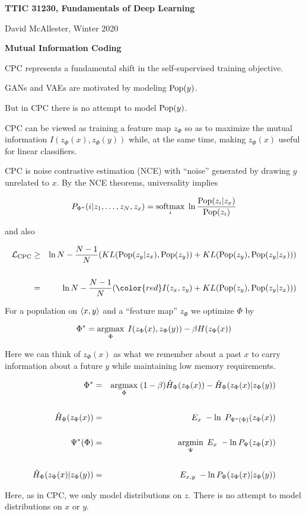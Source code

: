 





{\Huge
  \centerline{\bf TTIC 31230,  Fundamentals of Deep Learning}
  \vfill
  \centerline{David McAllester, Winter 2020}
  \vfill
  \centerline{\bf Mutual Information Coding}
  \vfill
  \vfill
  

CPC represents a fundamental shift in the self-supervised training objective.

\vfill
GANs and VAEs are motivated by modeling $\mathrm{Pop}(y)$.

\vfill
But in CPC there is no attempt to model $\mathrm{Pop}(y)$.

\vfill
CPC can be viewed as training a feature map $z_\Phi$ so as to maximize the mutual information {\color{red} $I(z_\Phi(x),z_\Phi(y))$} while, at the same time, making $z_\Phi(x)$ useful
for linear classifiers.


CPC is noise contrastive estimation (NCE) with ``noise'' generated by drawing $y$ unrelated to $x$.
By the NCE theorems, universality implies

$$P_{\Phi^*}(i|z_1,\ldots,z_N,z_x) = \operatorname*{softmax}_i \;\ln \frac{\mathrm{Pop}(z_i|z_x)}{\mathrm{Pop}(z_i)}$$

and also

{\huge
\begin{eqnarray*}
{\cal L}_\mathrm{CPC} & \geq & \ln N - \frac{N-1}{N}(KL(\pop(z_y|z_x),\pop(z_y)) + KL(\pop(z_y),\pop(z_y|z_x))) \\
\\
& = & \ln N - \frac{N-1}{N}({\color{red} I(z_x,z_y)} + KL(\pop(z_y),\pop(z_y|z_x)))
\end{eqnarray*}
}


For a population on ${\mbox{$\langle x,y\rangle$}}$ and a ``feature map'' $z_\Phi$ we optimize $\Phi$ by

\vfill
$$\Phi^* = \operatorname*{argmax}_\Phi \; I(z_\Phi(x),z_\Phi(y)) - \beta H(z_\Phi(x))$$


\vfill
Here we can think of $z_\Phi(x)$ as what we remember about a past $x$ to carry information about a future $y$ while maintaining low memory requirements.


\begin{eqnarray*}
\Phi^* & = & \operatorname*{argmax}_\Phi \; (1-\beta)\hat{H}_\Phi(z_\Phi(x)) - \hat{H}_\Phi(z_\Phi(x)|z_\Phi(y)) \\
\\
\hat{H}_\Phi(z_\Phi(x)) & = & E_x \; -\ln \;P_{\Psi^*(\Phi)}(z_\Phi(x)) \\
\\
\Psi^*(\Phi) & = & \operatorname*{argmin}_\Psi\;E_x\;-\ln P_\Psi(z_\Phi(x)) \\
\\
\hat{H}_\Phi(z_\Phi(x)|z_\Phi(y)) & = & E_{x,y} \; -\ln P_\Phi(z_\Phi(x)|z_\Phi(y)) 
\end{eqnarray*}

\vfill
Here, as in CPC, we only model distributions on $z$.  There is no attempt to model distributions on $x$ or $y$.


}

